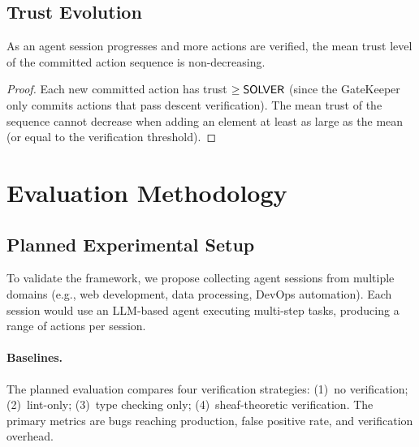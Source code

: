 \documentclass[11pt]{article}
\begin{document}
\subsection{Trust Evolution}\label{subsec:trust-evolution}

\begin{proposition}\label{prop:trust-mono}
As an agent session progresses and more actions are verified, the
mean trust level of the committed action sequence is non-decreasing.
\end{proposition}

\begin{proof}
Each new committed action has trust $\geq \mathsf{SOLVER}$ (since the
GateKeeper only commits actions that pass descent verification).
The mean trust of the sequence cannot decrease when adding an element
at least as large as the mean (or equal to the verification threshold).
\end{proof}


\section{Evaluation Methodology}\label{sec:experiments}

\subsection{Planned Experimental Setup}\label{subsec:setup}

To validate the framework, we propose collecting agent sessions from
multiple domains (e.g., web development, data processing, DevOps
automation).  Each session would use an LLM-based agent executing
multi-step tasks, producing a range of actions per session.

\paragraph{Baselines.}
The planned evaluation compares four verification strategies:
(1)~no verification; (2)~lint-only; (3)~type checking only;
(4)~sheaf-theoretic verification.  The primary metrics are bugs
reaching production, false positive rate, and verification overhead.
\end{document}
